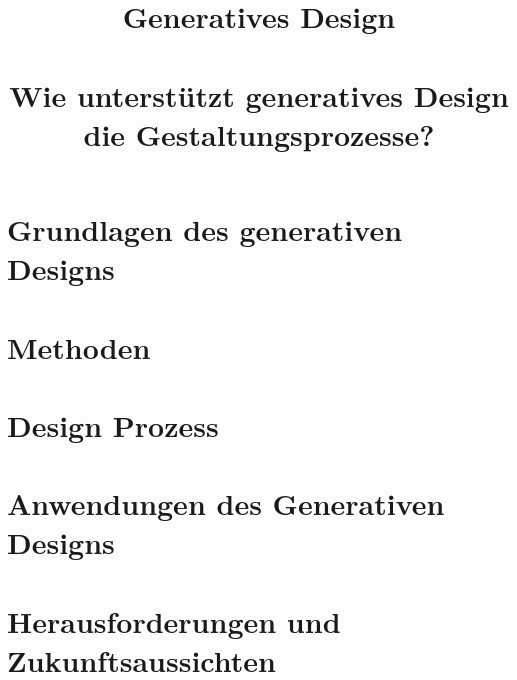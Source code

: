 \documentclass[conference]{IEEEtran}
\begin{document}
\title{Generatives Design\\
\large \ \\ \large Wie unterstützt generatives Design die Gestaltungsprozesse?}

\author{

  \and

}

\maketitle

\thispagestyle{plain} %
\pagestyle{plain} %
\setcounter{page}{1} %



\section{Grundlagen des generativen Designs}


\section{Methoden}


\section{Design Prozess}


\section{Anwendungen des Generativen Designs}


\section{Herausforderungen und Zukunftsaussichten}

\end{document}

